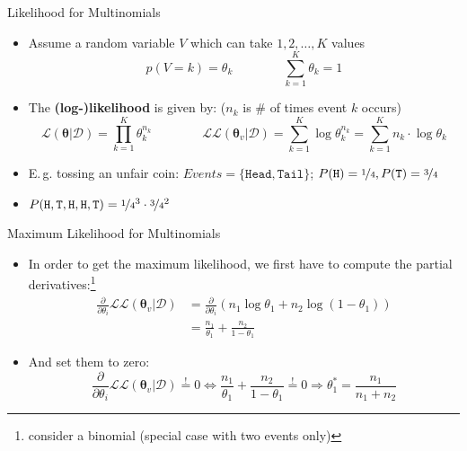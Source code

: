 \begin{frame}{Likelihood for Multinomials}{}
	\begin{itemize}
		\item Assume a random variable $V$ which can take $1, 2, \dots, K$ values
		\begin{equation*}
			p(V = k) = \theta_k \qquad\qquad \sum_{k=1}^K \theta_k = 1
		\end{equation*}
		\item The \textbf{(log-)likelihood} is given by: {\footnotesize ($n_k$ is \# of times event $k$ occurs)}
		\begin{equation*}
			\mathcal{L}(\bm{\theta} \vert \mathcal{D}) = \prod_{k=1}^K \theta_k^{n_k} \qquad\qquad
			\mathcal{L}\mathcal{L}(\bm{\theta}_v \vert \mathcal{D}) = \sum_{k=1}^K \log \theta_k^{n_k}
				= \sum_{k=1}^K n_k \cdot \log \theta_k
		\end{equation*}
		\item E.\,g. tossing an unfair coin: $Events = \{\texttt{Head}, \texttt{Tail}\}$;
			$P(\texttt{H}) = \nicefrac{1}{4}, P(\texttt{T}) = \nicefrac{3}{4}$
		\item $P(\texttt{H}, \texttt{T}, \texttt{H}, \texttt{H}, \texttt{T}) = \nicefrac{1}{4}^3 \cdot \nicefrac{3}{4}^2$
	\end{itemize}
\end{frame}


\begin{frame}{Maximum Likelihood for Multinomials}{}
	\begin{itemize}
		\item In order to get the maximum likelihood, we first have to compute the partial derivatives:\footnote[frame]{
			consider a binomial (special case with two events only)
		}
		\begin{align*}
			\frac{\partial}{\partial \theta_i} \mathcal{L}\mathcal{L}(\bm{\theta}_v \vert \mathcal{D})
				&= \frac{\partial}{\partial \theta_i} (n_1 \log \theta_1 + n_2 \log(1 - \theta_1)) \\
				&= \frac{n_1}{\theta_1} + \frac{n_2}{1 - \theta_1}
		\end{align*}
		\item And set them to zero:
		\begin{equation*}
			\frac{\partial}{\partial \theta_i} \mathcal{L}\mathcal{L}(\bm{\theta}_v \vert \mathcal{D}) \overset{!}{=} 0 
			\Leftrightarrow \frac{n_1}{\theta_1} + \frac{n_2}{1 - \theta_1} \overset{!}{=} 0
			\Rightarrow \boxed{\theta_1^* = \frac{n_1}{n_1 + n_2}}
		\end{equation*}
	\end{itemize}
\end{frame}


